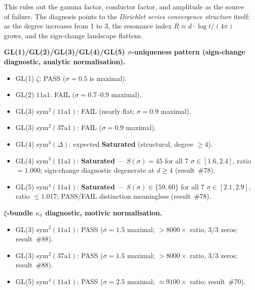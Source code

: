 \documentclass[11pt, a4paper]{article}
\theoremstyle{definition}
\theoremstyle{plain}
\begin{document}
This rules out the gamma factor, conductor factor, and amplitude as the
source of failure.  The diagnosis points to the \emph{Dirichlet series
convergence structure} itself: as the degree increases from 1 to 3, the
resonance index $R \approx d \cdot \log t / (4\pi)$ grows, and the
sign-change landscape flattens.

\medskip\noindent
\textbf{GL(1)/GL(2)/GL(3)/GL(4)/GL(5) $\sigma$-uniqueness pattern
(sign-change diagnostic, analytic normalisation).}
\begin{itemize}
  \item GL(1) $\zeta$: PASS ($\sigma = 0.5$ is maximal).
  \item GL(2) $11\text{a}1$: FAIL ($\sigma = 0.7$--$0.9$ maximal).
  \item GL(3) $\mathrm{sym}^2(11\text{a}1)$: FAIL (nearly flat; $\sigma = 0.9$ maximal).
  \item GL(3) $\mathrm{sym}^2(37\text{a}1)$: FAIL ($\sigma = 0.9$ maximal).
  \item GL(4) $\mathrm{sym}^3(\Delta)$: expected \textbf{Saturated} (structural, degree $\geq 4$).
  \item GL(4) $\mathrm{sym}^3(11\text{a}1)$: \textbf{Saturated} --- $S(\sigma) = 45$ for all 7 $\sigma \in [1.6, 2.4]$, ratio $= 1.000$; sign-change diagnostic degenerate at $d \geq 4$ (result~\#78).
  \item GL(5) $\mathrm{sym}^4(11\text{a}1)$: \textbf{Saturated} --- $S(\sigma) \in \{59,60\}$ for all 7 $\sigma \in [2.1, 2.9]$, ratio $\leq 1.017$; PASS/FAIL distinction meaningless (result~\#78).
\end{itemize}

\textbf{$\xi$-bundle $\kappa_\sigma$ diagnostic, motivic normalisation.}
\begin{itemize}
  \item GL(3) $\mathrm{sym}^2(11\text{a}1)$: PASS ($\sigma = 1.5$ maximal; $> 8000\times$ ratio, 3/3 zeros; result~\#88).
  \item GL(3) $\mathrm{sym}^2(37\text{a}1)$: PASS ($\sigma = 1.5$ maximal; $> 8000\times$ ratio, 3/3 zeros; result~\#88).
  \item GL(5) $\mathrm{sym}^4(11\text{a}1)$: PASS ($\sigma = 2.5$ maximal; $\approx 9100\times$ ratio; result~\#70).
\end{itemize}
\end{document}
